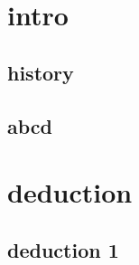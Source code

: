 \documentclass{book}    %
\begin{document}
\chapter{intro}
\section{history}

\section{abcd}

\chapter{deduction}
\section{deduction 1}
\end{document}
